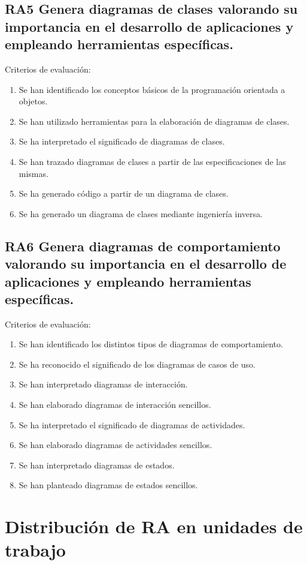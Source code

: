 \documentclass[a4paper]{article}
\begin{document}
\subsection{RA5 Genera diagramas de clases valorando su importancia en el desarrollo de aplicaciones y empleando herramientas específicas.}
\label{sec:org0000024}
Criterios de evaluación:
\begin{enumerate}
\item Se han identificado los conceptos básicos de la programación orientada a objetos.
\item Se han utilizado herramientas para la elaboración de diagramas de clases.
\item Se ha interpretado el significado de diagramas de clases.
\item Se han trazado diagramas de clases a partir de las especificaciones de las mismas.
\item Se ha generado código a partir de un diagrama de clases.
\item Se ha generado un diagrama de clases mediante ingeniería inversa.
\end{enumerate}
\subsection{RA6 Genera diagramas de comportamiento valorando su importancia en el desarrollo de aplicaciones y empleando herramientas específicas.}
\label{sec:org0000027}
Criterios de evaluación:
\begin{enumerate}
\item Se han identificado los distintos tipos de diagramas de comportamiento.
\item Se ha reconocido el significado de los diagramas de casos de uso.
\item Se han interpretado diagramas de interacción.
\item Se han elaborado diagramas de interacción sencillos.
\item Se ha interpretado el significado de diagramas de actividades.
\item Se han elaborado diagramas de actividades sencillos.
\item Se han interpretado diagramas de estados.
\item Se han planteado diagramas de estados sencillos.
\end{enumerate}
\section{Distribución de RA en unidades de trabajo}
\label{sec:org000002d}
\end{document}
